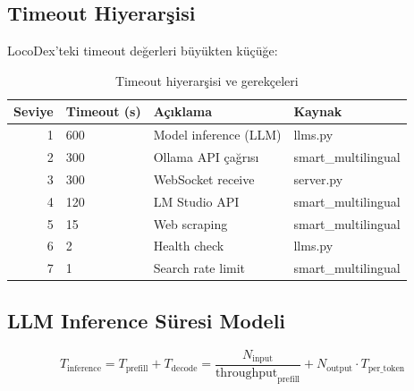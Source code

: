 \subsection{Timeout Hiyerar\c{s}isi}
\label{sec:timeout-hierarchy}

LocoDex'teki timeout de\u{g}erleri b\"{u}y\"{u}kten k\"{u}\c{c}\"{u}\u{g}e:

\begin{table}[H]
\centering
\caption{Timeout hiyerar\c{s}isi ve gerek\c{c}eleri}
\label{tab:timeouts}
\begin{tabularx}{\textwidth}{rlXl}
\toprule
\color{chapterBlue}\textbf{Seviye} & \color{chapterBlue}\textbf{Timeout (s)} & \color{chapterBlue}\textbf{A\c{c}{\i}klama} & \color{chapterBlue}\textbf{Kaynak} \\
\midrule
1 & 600  & Model inference (LLM)           & llms.py \\
2 & 300  & Ollama API \c{c}a\u{g}r{\i}s{\i}          & smart\_multilingual \\
3 & 300  & WebSocket receive               & server.py \\
4 & 120  & LM Studio API                   & smart\_multilingual \\
5 & 15   & Web scraping                    & smart\_multilingual \\
6 & 2    & Health check                    & llms.py \\
7 & 1    & Search rate limit               & smart\_multilingual \\
\bottomrule
\end{tabularx}
\end{table}

\subsection{LLM Inference S\"{u}resi Modeli}
\label{sec:inference-time}

\begin{equation}
\label{eq:inference}
T_{\mathrm{inference}} = T_{\mathrm{prefill}} + T_{\mathrm{decode}} = \frac{N_{\mathrm{input}}}{\text{throughput}_{\mathrm{prefill}}} + N_{\mathrm{output}} \cdot T_{\mathrm{per\_token}}
\end{equation}

